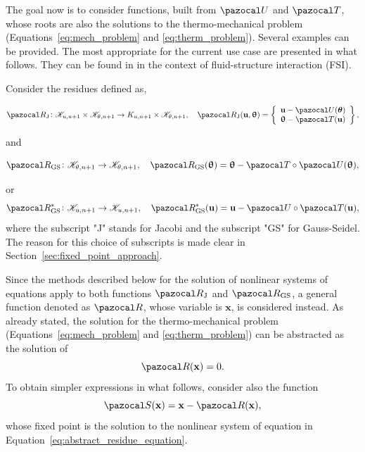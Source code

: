 The goal now is to consider functions, built from \(\pazocal U\) and \(\pazocal T\), whose roots are also the solutions to the thermo-mechanical problem (Equations~\eqref{eq:mech_problem} and \eqref{eq:therm_problem}).
Several examples can be provided.
The most appropriate for the current use case are presented in what follows.
They can be found in \cite{uekermann_partitioned_2016} in the context of fluid-structure interaction (FSI).

Consider the residues defined as,
\begin{highlight}
\begin{equation} \label{eq:def_res_jacobi}
  \pazocal R_\text{J}\colon \mathscr K_{u,n+1}\times\mathscr K_{\theta,n+1} \to K_{u,n+1}\times\mathscr K_{\theta,n+1},\quad  \pazocal R_\text{J}(\mathbf u, \bm \uptheta) =
  \left\{\begin{array}{c}
  \mathbf u - \pazocal U(\bm \theta)\\
  \bm \uptheta - \pazocal T(\mathbf u)
  \end{array}\right\},
\end{equation}
\end{highlight}
and
\begin{highlight}
\begin{equation} \label{eq:def_res_gauss_seidel}
  \pazocal R_\text{GS}\colon \mathscr K_{\theta,n+1} \to\mathscr K_{\theta,n+1},\quad \pazocal R_\text{GS}(\bm \uptheta) =
  \bm \uptheta - \pazocal T\circ \pazocal U(\bm \uptheta),
\end{equation}
\end{highlight}
or
\begin{equation}
  \pazocal R^*_\text{GS}\colon \mathscr K_{u,n+1} \to\mathscr K_{u,n+1},\quad \pazocal R^*_\text{GS}(\mathbf u) =
  \mathbf u - \pazocal U\circ \pazocal T(\mathbf u),
\end{equation}
where the subscript "J" stands for Jacobi and the subscript "GS" for Gauss-Seidel.
The reason for this choice of subscripts is made clear in Section~\ref{sec:fixed_point_approach}.


Since the methods described below for the solution of nonlinear systems of equations apply to both functions \(\pazocal R_\mathrm{J}\) and \(\pazocal R_\mathrm{GS}\), a general function denoted as \(\pazocal R\), whose variable is \(\mathbf x\), is considered instead.
As already stated, the solution for the thermo-mechanical problem (Equations~\eqref{eq:mech_problem} and \eqref{eq:therm_problem}) can be abstracted as the solution of
\begin{equation} \label{eq:abstract_residue_equation}
  \pazocal R(\mathbf x) = 0.
\end{equation}
To obtain simpler expressions in what follows, consider also the function
\begin{equation}
\pazocal S(\mathbf x) = \mathbf x - \pazocal R(\mathbf x),
\end{equation}
whose fixed point is the solution to the nonlinear system of equation in Equation~\eqref{eq:abstract_residue_equation}.

